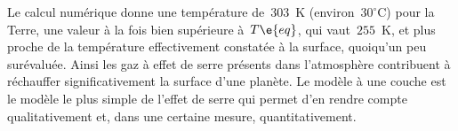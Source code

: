 \sk
Le calcul numérique donne une température de~$303$~K (environ~$30^{\circ}$C) pour la Terre, une valeur à la fois bien supérieure à~$T\e{eq}$, qui vaut~$255$~K, et plus proche de la température effectivement constatée à la surface, quoiqu'un peu surévaluée. Ainsi les gaz à effet de serre présents dans l'atmosphère contribuent à réchauffer significativement la surface d'une planète. Le modèle à une couche est le modèle le plus simple de l'effet de serre qui permet d'en rendre compte qualitativement et, dans une certaine mesure, quantitativement.
